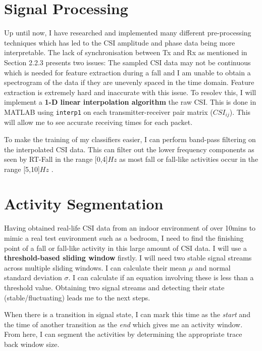 \section{Signal Processing}
Up until now, I have researched and implemented many different pre-processing techniques which has led to the CSI amplitude and phase data being more interpretable. The lack of synchronisation between Tx and Rx as mentioned in Section 2.2.3 presents two issues: The sampled CSI data may not be continuous which is needed for feature extraction during a fall and I am unable to obtain a spectrogram of the data if they are unevenly spaced in the time domain. Feature extraction is extremely hard and inaccurate with this issue. To resolev this, I will implement a \textbf{ 1-D linear interpolation algorithm} the raw CSI. This is done in MATLAB using \lstinline{interp1} on each transmitter-receiver pair matrix ($CSI_{ij}$). This will allow me to see accurate receiving times for each packet.\par
To make the training of my classifiers easier, I can perform band-pass filtering on the interpolated CSI data. This can filter out the lower frequency components as seen by RT-Fall in the range [0,4]$Hz$ as most fall or fall-like activities occur in the range [5,10]$Hz$ \citep{RTFall}.
\section{Activity Segmentation}
Having obtained real-life CSI data from an indoor environment of over 10mins to mimic a real test environment such as a bedroom, I need to find the finishing point of a fall or fall-like activity in this large amount of CSI data. I will use a \textbf{threshold-based sliding window} firstly. I will need two stable signal streams across multiple sliding windows. I can calculate their mean $\mu$ and normal standard deviation $\sigma$. I can calculate if an equation involving these is less than a threshold value. Obtaining two signal streams and detecting their state (stable/fluctuating) leads me to the next steps. \par
When there is a transition in signal state, I can mark this time as the \textit{start} and the time of another transition as the \textit{end} which gives me an activity window. From here, I can segment the activities by determining the appropriate trace back window size. 
